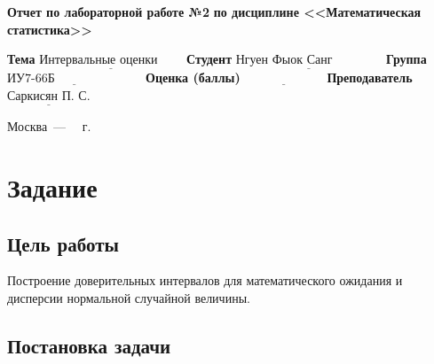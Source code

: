 \documentclass[12pt]{report}
\begin{document}
\begin{titlepage}
		\begin{center}
			\noindent\begin{minipage}{1.1\textwidth}\centering
				\Large\textbf{  Отчет по лабораторной работе №2}\newline
				\textbf{по дисциплине <<Математическая статистика>>}\newline\newline\newline\newline
			\end{minipage}
		\end{center}
		
		\noindent\textbf{Тема} $\underline{\text{Интервальные оценки~~~~~~}}$\newline\newline
		\noindent\textbf{Студент} $\underline{\text{Нгуен Фыок Санг~~~~~~~~~~~~}}$\newline\newline
		\noindent\textbf{Группа} $\underline{\text{ИУ7-66Б~~~~~~~~~~~~~~~~~~~~~}}$\newline\newline
		\noindent\textbf{Оценка (баллы)} $\underline{\text{~~~~~~~~~~~~~~~~~~~}}$\newline\newline
		\noindent\textbf{Преподаватель} $\underline{\text{Саркисян П. С.}}$\newline\newline\newline
		
		\begin{center}
			\vfill
			Москва~---~\the\year
			~г.
		\end{center}
	\end{titlepage}

\chapter*{Задание}

\section*{Цель работы}
Построение доверительных интервалов для математического ожидания и дисперсии нормальной случайной величины.

\section*{Постановка задачи}
\end{document}

